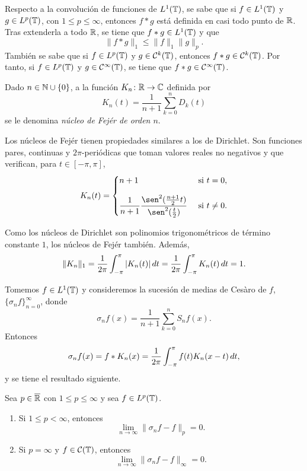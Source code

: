 \documentclass[a4paper, 12pt, oneside]{book}
\begin{document}
Respecto a la convolución de funciones de $L^1(\mathbb T)$, se sabe que si $f \in L^1(\mathbb T)$ y $g \in L^p(\mathbb T)$, con $1 \leq p \leq \infty$, entonces $f \ast g$ está definida en casi todo punto de $\mathbb R$. Tras extenderla a todo $\mathbb R$, se tiene que $f \ast g \in L^1(\mathbb T)$ y que
\[\|f \ast g\|_1 \leq \|f\|_1\|g\|_p.\]
También se sabe que si $f \in L^p(\mathbb T)$ y $g \in \mathcal{C}^k(\mathbb T)$, entonces $f \ast g \in \mathcal{C}^k(\mathbb T)$. Por tanto, si $f \in L^p(\mathbb T)$ y $g \in \mathcal{C}^\infty(\mathbb T)$, se tiene que $f \ast g \in \mathcal{C}^\infty(\mathbb T)$.

\begin{definition}\label{1.2.5}
    Dado $n \in \mathbb N \cup \{0\}$, a la función $K_n \colon \mathbb R \to \mathbb C$ definida por
    \[K_n(t) = \frac{1}{n+1}\sum_{k=0}^n D_k(t)\]
    se le denomina \emph{núcleo de Fejér de orden $n$}.
\end{definition}

Los núcleos de Fejér tienen propiedades similares a los de Dirichlet. Son funciones pares, continuas y $2\pi$-periódicas que toman valores reales no negativos y que verifican, para $t \in [-\pi,\pi]$,
\[K_n(t) = \begin{cases}
    n+1 & $ si $ t = 0, \\[10pt]
    \displaystyle\frac{1}{n+1}\frac{\sen^2(\frac{n+1}{2}t)}{\sen^2(\frac{t}{2})} & $ si $ t \neq 0. 
\end{cases}\]

Como los núcleos de Dirichlet son polinomios trigonométricos de término constante $1$, los núcleos de Fejér también. Además,
\[\|K_n\|_1 = \frac{1}{2\pi}\int_{-\pi}^{\pi} |K_n(t)| \, dt =  \frac{1}{2\pi}\int_{-\pi}^{\pi} K_n(t) \, dt = 1.\]

Tomemos $f \in L^1(\mathbb T)$ y consideremos la sucesión de medias de Cesàro de $f$, $\{\sigma_nf\}_{n=0}^\infty$, donde
\[\sigma_nf(x) = \frac{1}{n+1}\sum_{k=0}^nS_nf(x).\]
Entonces
\[\sigma_nf(x) = f \ast K_n(x) = \frac{1}{2\pi}\int_{-\pi}^{\pi} f(t)K_n(x-t) \, dt,\]
y se tiene el resultado siguiente.

\begin{theorem}\label{1.2.6}
    Sea $p \in \overline{\mathbb R}$ con $1 \leq p \leq \infty$ y sea $f \in L^p(\mathbb T)$.
    \begin{enumerate}
        \item Si $1 \leq p < \infty$, entonces
        \[\lim_{n \to \infty} \|\sigma_nf - f\|_p = 0.\]
        \item Si $p = \infty$ y $f \in \mathcal{C}(\mathbb T)$, entonces
        \[\lim_{n \to \infty} \|\sigma_nf - f\|_\infty = 0.\]
    \end{enumerate}
\end{theorem}
\end{document}
